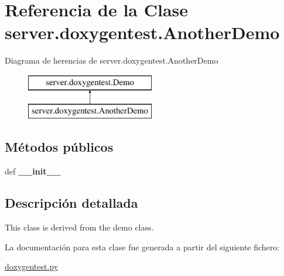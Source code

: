 \hypertarget{classserver_1_1doxygentest_1_1_another_demo}{\section{Referencia de la Clase server.\-doxygentest.\-Another\-Demo}
\label{classserver_1_1doxygentest_1_1_another_demo}
}
Diagrama de herencias de server.\-doxygentest.\-Another\-Demo\begin{figure}[H]
\begin{center}
\leavevmode
\includegraphics[height=2.000000cm]{classserver_1_1doxygentest_1_1_another_demo}
\end{center}
\end{figure}
\subsection*{Métodos públicos}
\begin{DoxyCompactItemize}
\item 
\hypertarget{classserver_1_1doxygentest_1_1_another_demo_a4e4707c541521e6e2f13020946624cb9}{def {\bfseries \-\_\-\-\_\-init\-\_\-\-\_\-}}\label{classserver_1_1doxygentest_1_1_another_demo_a4e4707c541521e6e2f13020946624cb9}

\end{DoxyCompactItemize}


\subsection{Descripción detallada}
\begin{DoxyVerb}\brief This class is derived from the demo class.\end{DoxyVerb}
 

La documentación para esta clase fue generada a partir del siguiente fichero\-:\begin{DoxyCompactItemize}
\item 
\hyperlink{doxygentest_8py}{doxygentest.\-py}\end{DoxyCompactItemize}
